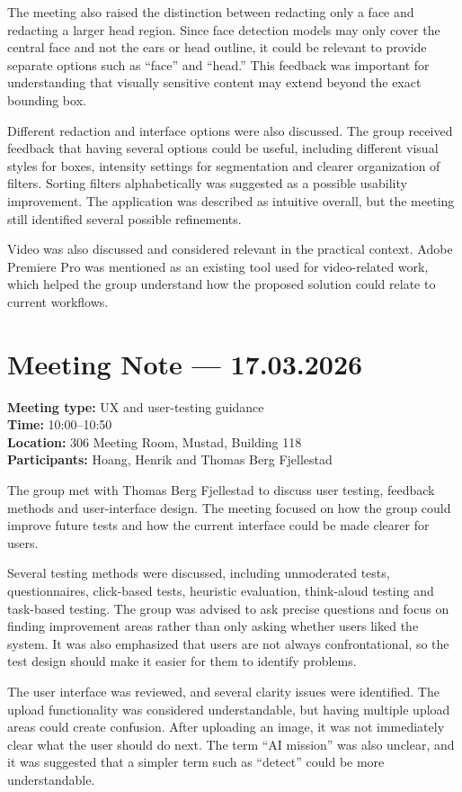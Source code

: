 The meeting also raised the distinction between redacting only a face and redacting a larger head region. Since face detection models may only cover the central face and not the ears or head outline, it could be relevant to provide separate options such as ``face'' and ``head.'' This feedback was important for understanding that visually sensitive content may extend beyond the exact bounding box.

Different redaction and interface options were also discussed. The group received feedback that having several options could be useful, including different visual styles for boxes, intensity settings for segmentation and clearer organization of filters. Sorting filters alphabetically was suggested as a possible usability improvement. The application was described as intuitive overall, but the meeting still identified several possible refinements.

Video was also discussed and considered relevant in the practical context. Adobe Premiere Pro was mentioned as an existing tool used for video-related work, which helped the group understand how the proposed solution could relate to current workflows.

\section{Meeting Note --- 17.03.2026}
\label{app:meeting-2026-03-17}
\textbf{Meeting type:} UX and user-testing guidance\\
\textbf{Time:} 10:00--10:50\\
\textbf{Location:} 306 Meeting Room, Mustad, Building 118\\
\textbf{Participants:} Hoang, Henrik and Thomas Berg Fjellestad

The group met with Thomas Berg Fjellestad to discuss user testing, feedback methods and user-interface design. The meeting focused on how the group could improve future tests and how the current interface could be made clearer for users.

Several testing methods were discussed, including unmoderated tests, questionnaires, click-based tests, heuristic evaluation, think-aloud testing and task-based testing. The group was advised to ask precise questions and focus on finding improvement areas rather than only asking whether users liked the system. It was also emphasized that users are not always confrontational, so the test design should make it easier for them to identify problems.

The user interface was reviewed, and several clarity issues were identified. The upload functionality was considered understandable, but having multiple upload areas could create confusion. After uploading an image, it was not immediately clear what the user should do next. The term ``AI mission'' was also unclear, and it was suggested that a simpler term such as ``detect'' could be more understandable.

